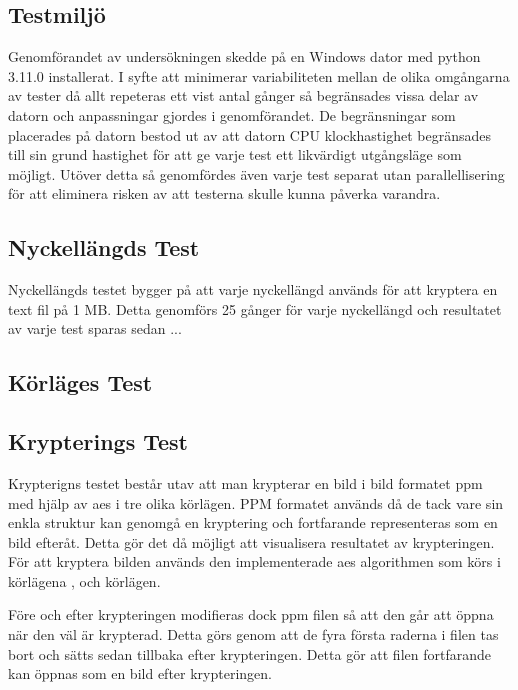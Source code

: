 \subsection{Testmiljö} %
Genomförandet av undersökningen skedde på en Windows dator med \gls{python} 3.11.0 installerat. I syfte att minimerar variabiliteten
mellan de olika omgångarna av tester då allt repeteras ett vist antal gånger så begränsades vissa delar av datorn och anpassningar gjordes i genomförandet.
De begränsningar som placerades på datorn bestod ut av att datorn CPU klockhastighet begränsades till sin grund hastighet för att ge
varje test ett likvärdigt utgångsläge som möjligt. Utöver detta så genomfördes även varje test separat utan parallellisering för att
eliminera risken av att testerna skulle kunna påverka varandra.

\subsection{Nyckellängds Test} %
\label{sec:nyckellangd-test}
Nyckellängds testet bygger på att varje nyckellängd används för att kryptera en text fil på 1 MB. Detta genomförs 25 gånger för
varje nyckellängd och resultatet av varje test sparas sedan ...

\subsection{Körläges Test} %
\label{sec:körlages-test}


\subsection{Krypterings Test} %
\label{sec:krypterings-test}
Krypterigns testet består utav att man krypterar en bild i bild formatet \gls{ppm} med hjälp av \acrshort{aes} i tre olika körlägen.
PPM formatet används då de tack vare sin enkla struktur kan genomgå en kryptering och fortfarande representeras som en bild
efteråt. Detta gör det då möjligt att visualisera resultatet av krypteringen. För att kryptera bilden används den implementerade
\acrshort{aes} algorithmen som körs i körlägena ,  och  körlägen.

Före och efter krypteringen modifieras dock \gls{ppm} filen så att den går att öppna när den väl är krypterad. Detta görs genom att de fyra
första raderna i filen tas bort och sätts sedan tillbaka efter krypteringen. Detta gör att filen fortfarande kan öppnas som en bild
efter krypteringen.

